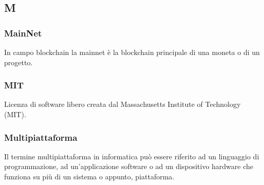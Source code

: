 \subsection*{\textbf{\hfill \Huge{M} \hfill}} 
\subsubsection*{MainNet}
In campo blockchain la mainnet è la blockchain principale di una moneta o di un progetto.
\subsubsection*{MIT}
Licenza di software libero creata dal Massachusetts Institute of Technology (MIT).
\subsubsection*{Multipiattaforma}
Il termine multipiattaforma in informatica può essere riferito ad un linguaggio di programmazione, ad un'applicazione software o ad un dispositivo hardware che funziona su più di un sistema o appunto, piattaforma.
